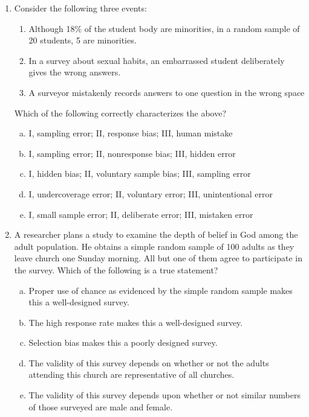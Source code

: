 \documentclass[a4paper,12pt,twoside]{book}
\begin{document}
\begin{enumerate}
  \item Consider the following three events:
      \begin{enumerate}[\Roman*.]
          \item  Although 18\% of the student body are minorities, in a random sample of 20 students, 5 are minorities.
          \item In a survey about sexual habits, an embarrassed student deliberately gives the wrong answers.
          \item A surveyor mistakenly records answers to one question in the wrong space
      \end{enumerate}   
      Which of the following correctly characterizes the above?
         \begin{enumerate}[(a)]
             \item  I, sampling error; II, response bias; III, human mistake
             \item I, sampling error; II, nonresponse bias; III, hidden error
             \item I, hidden bias; II, voluntary sample bias; III, sampling error
             \item  I, undercoverage error; II, voluntary error; III, unintentional error
             \item  I, small sample error; II, deliberate error; III, mistaken error
         \end{enumerate}              
    \item   A researcher plans a study to examine the depth of belief in God among the adult population. He obtains a simple random sample of 100 adults as they leave church one Sunday morning. All but one of them agree to participate in the survey. Which of the following is a true statement?
       \begin{enumerate}[(a)]
           \item Proper use of chance as evidenced by the simple random sample makes this a well-designed survey.
           \item The high response rate makes this a well-designed survey.
           \item Selection bias makes this a poorly designed survey.
           \item The validity of this survey depends on whether or not the adults attending this church are representative of all churches.
           \item The validity of this survey depends upon whether or not similar numbers of those surveyed are male and female.
       \end{enumerate}
        

\end{enumerate}
\end{document}
